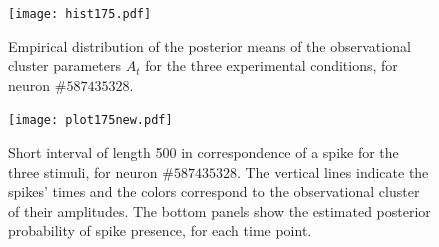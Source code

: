 \begin{figure}
	\centering
	\begin{minipage}{0.45\textwidth}
		\centering
		\texttt{[image: hist175.pdf]}
		\caption[Distribution of the observational cluster parameters for the three experimental conditions of neuron $\#587435328$.]{Empirical distribution of the posterior means of the observational cluster parameters $A_t$ for the three experimental conditions, for neuron $\#587435328$.}
		\label{fig:A_distr2}
	\end{minipage}\hfill
	\begin{minipage}{0.45\textwidth}
		\centering
		\texttt{[image: plot175new.pdf]}
			\caption[Visual representation of the estimated spikes and their amplitudes in the calcium trace of neuron $\#587435328$.]{Short interval of length 500 in correspondence of a spike for the three stimuli, for neuron $\#587435328$. The vertical lines indicate the spikes' times and the colors correspond to the observational cluster of their amplitudes. The bottom panels show the estimated posterior probability of spike presence, for each time point.}
		\label{fig:spike_color2}
	\end{minipage}
\end{figure}









